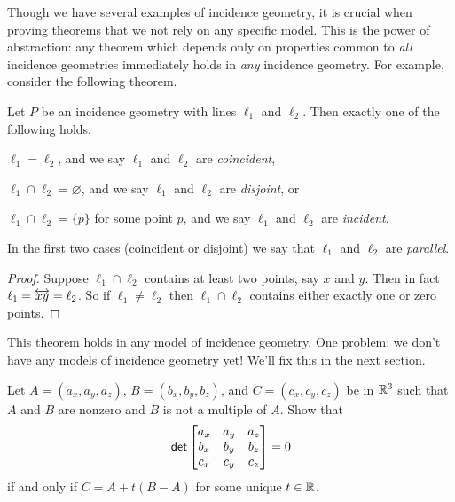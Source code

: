 Though we have several examples of incidence geometry, it is crucial when proving theorems that we not rely on any specific model.
This is the power of abstraction: any theorem which depends only on properties common to \emph{all} incidence geometries immediately holds in \emph{any} incidence geometry.
For example, consider the following theorem.

\begin{prop}
Let \(P\) be an incidence geometry with lines \(\ell_1\) and \(\ell_2\).
Then exactly one of the following holds.
\begin{proplist}
\item \(\ell_1 = \ell_2\), and we say \(\ell_1\) and \(\ell_2\) are \emph{coincident},
\item \(\ell_1 \cap \ell_2 = \varnothing\), and we say \(\ell_1\) and \(\ell_2\) are \emph{disjoint}, or
\item \(\ell_1 \cap \ell_2 = \{p\}\) for some point \(p\), and we say \(\ell_1\) and \(\ell_2\) are \emph{incident}.
\end{proplist}
In the first two cases (coincident or disjoint) we say that \(\ell_1\) and \(\ell_2\) are \emph{parallel}.
\end{prop}

\begin{proof}
Suppose \(\ell_1 \cap \ell_2\) contains at least two points, say \(x\) and \(y\).
Then in fact \(\ell_1 = \overleftrightarrow{xy} = \ell_2\).
So if \(\ell_1 \neq \ell_2\) then \(\ell_1 \cap \ell_2\) contains either exactly one or zero points.
\end{proof}

This theorem holds in any model of incidence geometry.
One problem: we don't have any models of incidence geometry yet!
We'll fix this in the next section.



\Exercises%

\begin{exercise}
Let \(A = (a_x, a_y, a_z)\), \(B = (b_x, b_y, b_z)\), and \(C = (c_x, c_y, c_z)\) be in \(\mathbb{R}^3\) such that \(A\) and \(B\) are nonzero and \(B\) is not a multiple of \(A\).
Show that \[ \mathsf{det} \begin{bmatrix} a_x & a_y & a_z \\ b_x & b_y & b_z \\ c_x & c_y & c_z \end{bmatrix} = 0 \] if and only if \(C = A + t(B - A)\) for some unique \(t \in \mathbb{R}\).
\end{exercise}

